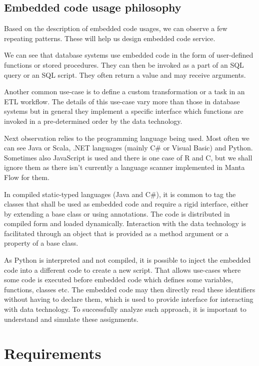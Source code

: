 \subsection{Embedded code usage philosophy}
Based on the description of embedded code usages, we can observe a few repeating patterns. These will help us design embedded code service.
\par
We can see that database systems use embedded code in the form of user-defined functions or stored procedures. They can then be invoked as a part of an SQL query or an SQL script. They often return a value and may receive arguments.
\par
Another common use-case is to define a custom transformation or a task in an ETL workflow. The details of this use-case vary more than those in database systems but in general they implement a specific interface which functions are invoked in a pre-determined order by the data technology.
\par
Next observation relies to the programming language being used. Most often we can see Java or Scala, .NET languages (mainly C\# or Visual Basic) and Python. Sometimes also JavaScript is used and there is one case of R and C, but we shall ignore them as there isn't currently a language scanner implemented in Manta Flow for them.
\par
In compiled static-typed languages (Java and C\#), it is common to tag the classes that shall be used as embedded code and require a rigid interface, either by extending a base class or using annotations. The code is distributed in compiled form and loaded dynamically. Interaction with the data technology is facilitated through an object that is provided as a method argument or a property of a base class.
\par
As Python is interpreted and not compiled, it is possible to inject the embedded code into a different code to create a new script. That allows use-cases where some code is executed before embedded code which defines some variables, functions, classes etc. The embedded code may then directly read these identifiers without having to declare them, which is used to provide interface for interacting with data technology. To successfully analyze such approach, it is important to understand and simulate these assignments.

\section{Requirements}

